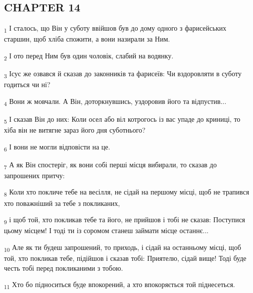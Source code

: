 \subsection{CHAPTER 14}
\begin{tcolorbox}
\textsubscript{1} І сталось, що Він у суботу ввійшов був до дому одного з фарисейських старшин, щоб хліба спожити, а вони назирали за Ним.
\end{tcolorbox}
\begin{tcolorbox}
\textsubscript{2} І ото перед Ним був один чоловік, слабий на водянку.
\end{tcolorbox}
\begin{tcolorbox}
\textsubscript{3} Ісус же озвався й сказав до законників та фарисеїв: Чи вздоровляти в суботу годиться чи ні?
\end{tcolorbox}
\begin{tcolorbox}
\textsubscript{4} Вони ж мовчали. А Він, доторкнувшись, уздоровив його та відпустив...
\end{tcolorbox}
\begin{tcolorbox}
\textsubscript{5} І сказав Він до них: Коли осел або віл котрогось із вас упаде до криниці, то хіба він не витягне зараз його дня суботнього?
\end{tcolorbox}
\begin{tcolorbox}
\textsubscript{6} І вони не могли відповісти на це.
\end{tcolorbox}
\begin{tcolorbox}
\textsubscript{7} А як Він спостеріг, як вони собі перші місця вибирали, то сказав до запрошених притчу:
\end{tcolorbox}
\begin{tcolorbox}
\textsubscript{8} Коли хто покличе тебе на весілля, не сідай на першому місці, щоб не трапився хто поважніший за тебе з покликаних,
\end{tcolorbox}
\begin{tcolorbox}
\textsubscript{9} і щоб той, хто покликав тебе та його, не прийшов і тобі не сказав: Поступися цьому місцем! І тоді ти із соромом станеш займати місце останнє...
\end{tcolorbox}
\begin{tcolorbox}
\textsubscript{10} Але як ти будеш запрошений, то приходь, і сідай на останньому місці, щоб той, хто покликав тебе, підійшов і сказав тобі: Приятелю, сідай вище! Тоді буде честь тобі перед покликаними з тобою.
\end{tcolorbox}
\begin{tcolorbox}
\textsubscript{11} Хто бо підноситься буде впокорений, а хто впокоряється той піднесеться.
\end{tcolorbox}

